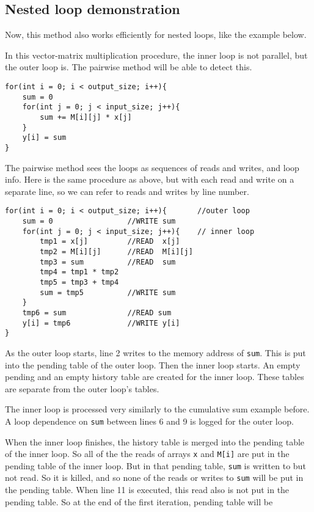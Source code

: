 \documentclass[12pt,twoside]{reedthesis}
\begin{document}
		\subsection{Nested loop demonstration}
		
		Now, this method also works efficiently for nested loops, like the example below.  
		
		In this vector-matrix multiplication procedure, the inner loop is not parallel, but the outer loop is. The pairwise method will be able to detect this. 
		
		\begin{lstlisting}
for(int i = 0; i < output_size; i++){
	sum = 0
	for(int j = 0; j < input_size; j++){
		sum += M[i][j] * x[j]
	}
	y[i] = sum
}
		\end{lstlisting}
		
		The pairwise method sees the loops as sequences of reads and writes, and loop info. Here is the same procedure as above, but with each read and write on a separate line, so we can refer to reads and writes by line number.

		\begin{lstlisting}
for(int i = 0; i < output_size; i++){	 	//outer loop
	sum = 0					//WRITE sum
	for(int j = 0; j < input_size; j++){ 	// inner loop
		tmp1 = x[j]			//READ  x[j]
		tmp2 = M[i][j]		//READ  M[i][j]
		tmp3 = sum			//READ  sum
		tmp4 = tmp1 * tmp2
		tmp5 = tmp3 + tmp4
		sum = tmp5			//WRITE sum
	}
	tmp6 = sum 				//READ sum
	y[i] = tmp6				//WRITE y[i]
}
		\end{lstlisting}
		
		
		As the outer loop starts, line 2 writes to the memory address of \texttt{sum}. This is put into the pending table of the outer loop. Then the inner loop starts. An empty pending and an empty history table are created for the inner loop. These tables are separate from the outer loop's tables.
		
		The inner loop is processed very similarly to the cumulative sum example before. A loop dependence on \texttt{sum} between lines 6 and 9 is logged for the outer loop.
		
		When the inner loop finishes, the history table is merged into the pending table of the inner loop. So all of the the reads of arrays \texttt{x} and \texttt{M[i]} are put in the pending table of the inner loop. But in that pending table, \texttt{sum} is written to but not read. So it is killed, and so none of the reads or writes to \texttt{sum} will be put in the pending table. When line 11 is executed, this read also is not put in the pending table. 
		So at the end of the first iteration, pending table will be
			
\end{document}
